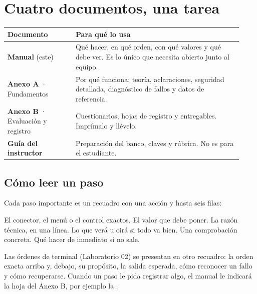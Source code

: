 

\section{Cuatro documentos, una tarea}

\begin{longtable}{@{}>{\raggedright\arraybackslash}p{0.27\linewidth}>{\raggedright\arraybackslash}p{0.66\linewidth}@{}}
\toprule
\textbf{Documento} & \textbf{Para qué lo usa} \\
\midrule
\endhead
\textbf{Manual} (este) & Qué hacer, en qué orden, con qué valores y qué debe ver. Es lo único que necesita abierto junto al equipo. \\
\textbf{Anexo A} · Fundamentos & Por qué funciona: teoría, aclaraciones, seguridad detallada, diagnóstico de fallos y datos de referencia. \\
\textbf{Anexo B} · Evaluación y registro & Cuestionarios, hojas de registro y entregables. Imprímalo y llévelo. \\
\textbf{Guía del instructor} & Preparación del banco, claves y rúbrica. No es para el estudiante. \\
\bottomrule
\end{longtable}

\subsection{Cómo leer un paso}

Cada paso importante es un recuadro con una acción y hasta seis filas:

{El conector, el menú o el control exactos.}
{El valor que debe poner.}
{La razón técnica, en una línea.}
{Lo que verá u oirá si todo va bien.}
{Una comprobación concreta.}
{Qué hacer de inmediato si no sale.}

Las órdenes de terminal (Laboratorio 02) se presentan en otro recuadro: la orden exacta arriba y, debajo, su propósito, la salida esperada, cómo reconocer un fallo y cómo recuperarse. Cuando un paso le pida registrar algo, el manual le indicará la hoja del Anexo B, por ejemplo la .

